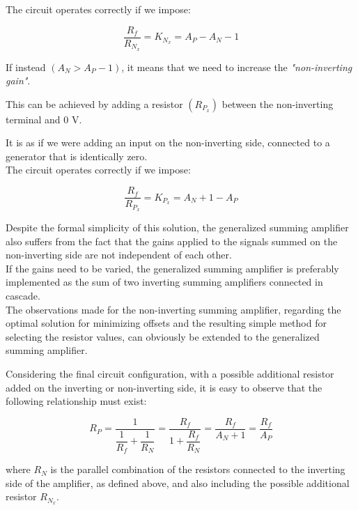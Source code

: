 \documentclass[../main.tex]{subfiles}
\begin{document}
The circuit operates correctly if we impose:

\begin{equation}
	\frac{R_f}{R_{N_x}} = K_{N_x} = A_P - A_N - 1	
\end{equation}

If instead $(A_N > A_P - 1)$, it means that we need to increase the \textit{"non-inverting gain"}. 

This can be achieved by adding a resistor $(R_{P_x})$ between the non-inverting terminal and 0 V. 

It is as if we were adding an input on the non-inverting side, connected to a generator that is identically zero.\\ 

The circuit operates correctly if we impose:


\begin{equation}
	\frac{R_f}{R_{P_x}} = K_{P_x} = A_N + 1 - A_P	
\end{equation}


Despite the formal simplicity of this solution, the generalized summing amplifier also suffers from the fact that the gains applied to the signals summed on the non-inverting side are not independent of each other.\\

If the gains need to be varied, the generalized summing amplifier is preferably implemented as the sum of two inverting summing amplifiers connected in cascade.\\

The observations made for the non-inverting summing amplifier, regarding the optimal solution for minimizing offsets and the resulting simple method for selecting the resistor values, can obviously be extended to the generalized summing amplifier.

Considering the final circuit configuration, with a possible additional resistor added on the inverting or non-inverting side, it is easy to observe that the following relationship must exist:

\begin{equation}
	R_P = \frac{1}{\dfrac{1}{R_f} + \dfrac{1}{R_N}} = \frac{R_f}{1 + \dfrac{R_f}{R_N}} = \frac{R_f}{A_N + 1} = \frac{R_f}{A_P}
\end{equation}

where $R_N$ is the parallel combination of the resistors connected to the inverting side of the amplifier, as defined above, and also including the possible additional resistor $R_{N_x}$.\\
\end{document}
